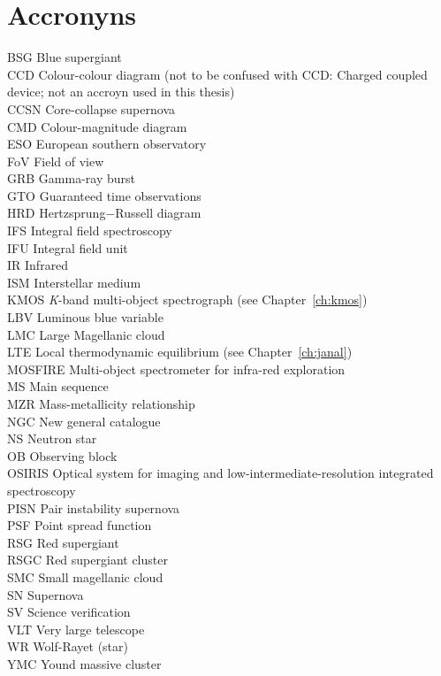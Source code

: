 \chapter{Accronyns}\label{ch:acc}

BSG Blue supergiant\\
CCD Colour-colour diagram (not to be confused with CCD: Charged coupled device; not an accroyn used in this thesis)\\
CCSN Core-collapse supernova\\
CMD Colour-magnitude diagram\\
ESO European southern observatory\\
FoV Field of view\\
GRB Gamma-ray burst\\
GTO Guaranteed time observations\\
HRD Hertzsprung$-$Russell diagram\\
IFS Integral field spectroscopy\\
IFU Integral field unit\\
IR Infrared\\
ISM Interstellar medium\\
KMOS {\it K}-band multi-object spectrograph (see Chapter~\ref{ch:kmos})\\
LBV Luminous blue variable\\
LMC Large Magellanic cloud\\
LTE Local thermodynamic equilibrium (see Chapter~\ref{ch:janal})\\
MOSFIRE Multi-object spectrometer for infra-red exploration\\
MS Main sequence\\
MZR Mass-metallicity relationship\\
NGC New general catalogue\\
NS Neutron star\\
OB Observing block\\
OSIRIS Optical system for imaging and low-intermediate-resolution integrated spectroscopy\\
PISN Pair instability supernova\\
PSF Point spread function\\
RSG Red supergiant\\
RSGC Red supergiant cluster\\
SMC Small magellanic cloud\\
SN Supernova\\
SV Science verification\\
VLT Very large telescope\\
WR Wolf-Rayet (star)\\
YMC Yound massive cluster\\
